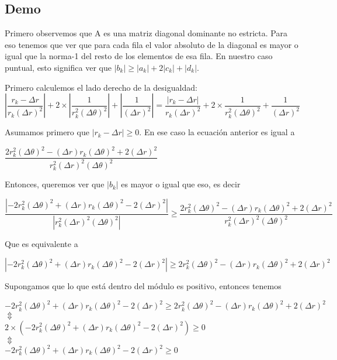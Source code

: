 \subsection{Demo}
Primero observemos que A es una matriz diagonal dominante no estricta. Para eso tenemos que ver que para cada fila el valor absoluto de la diagonal es mayor o igual que la norma-1 del resto de los elementos de esa fila. En nuestro caso puntual, esto significa ver que 
$|b_k| \geq |a_k| + 2|c_k| + |d_k|$. 

Primero calculemos el lado derecho de la desigualdad:
\begin{equation*}
\left\vert \dfrac{r_k - \Delta r}{r_k (\Delta r)^2}\right\vert +
2 \times \left\vert \dfrac{1}{r_k^2(\Delta \theta)^2} \right\vert+
\left\vert \dfrac{1}{(\Delta r)^2} \right\vert = 
\dfrac{\left\vert r_k - \Delta r \right\vert}{r_k (\Delta r)^2} +
2 \times \dfrac{1}{r_k^2(\Delta \theta)^2} +
\dfrac{1}{(\Delta r)^2}
\end{equation*}

Asumamos primero que $\left\vert r_k - \Delta r \right\vert \geq 0$. En ese caso la ecuación anterior es igual a
 
\begin{center}
$\dfrac{2 r_k^2 (\Delta \theta)^2 - (\Delta r) r_k (\Delta \theta)^2 + 2 (\Delta r)^2}{r_k^2 (\Delta r)^2 (\Delta \theta)^2}$
\end{center}

Entonces, queremos ver que $|b_k|$ es mayor o igual que eso, es decir

\begin{equation*}
\dfrac{\left\vert -2 r_k^2 (\Delta \theta)^2 + (\Delta r) r_k (\Delta \theta)^2 - 2 (\Delta r)^2 \right\vert } 
{\left\vert r_k^2 (\Delta r)^2 (\Delta \theta)^2 \right\vert } \geq
\dfrac{2 r_k^2 (\Delta \theta)^2 - (\Delta r) r_k (\Delta \theta)^2 + 2 (\Delta r)^2}{r_k^2 (\Delta r)^2 (\Delta \theta)^2}
\end{equation*}

Que es equivalente a

\begin{equation*}
\left\vert -2 r_k^2 (\Delta \theta)^2 + (\Delta r) r_k (\Delta \theta)^2 - 2 (\Delta r)^2 \right\vert \geq
2 r_k^2 (\Delta \theta)^2 - (\Delta r) r_k (\Delta \theta)^2 + 2 (\Delta r)^2
\end{equation*}

Supongamos que lo que está dentro del módulo es positivo, entonces tenemos

\begin{center}
$-2 r_k^2 (\Delta \theta)^2 + (\Delta r) r_k (\Delta \theta)^2 - 2 (\Delta r)^2 \geq
2 r_k^2 (\Delta \theta)^2 - (\Delta r) r_k (\Delta \theta)^2 + 2 (\Delta r)^2$ \\
$\Updownarrow$\\
$2\times (-2 r_k^2 (\Delta \theta)^2 + (\Delta r) r_k (\Delta \theta)^2 - 2 (\Delta r)^2) \geq 0$\\
$\Updownarrow$\\
$-2 r_k^2 (\Delta \theta)^2 + (\Delta r) r_k (\Delta \theta)^2 - 2 (\Delta r)^2 \geq 0$
\end{center}

